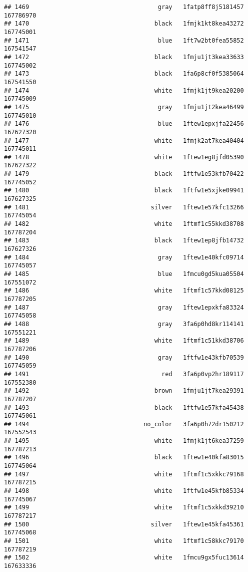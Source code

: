 \documentclass[
]{article}
\begin{document}
\begin{verbatim}
## 1469                                    gray   1fatp8ff8j5181457 167786970
## 1470                                   black   1fmjk1kt8kea43272 167745001
## 1471                                    blue   1ft7w2bt0fea55852 167541547
## 1472                                   black   1fmju1jt3kea33633 167745002
## 1473                                   black   1fa6p8cf0f5385064 167541550
## 1474                                   white   1fmjk1jt9kea20200 167745009
## 1475                                    gray   1fmju1jt2kea46499 167745010
## 1476                                    blue   1ftew1epxjfa22456 167627320
## 1477                                   white   1fmjk2at7kea40404 167745011
## 1478                                   white   1ftew1eg8jfd05390 167627322
## 1479                                   black   1ftfw1e53kfb70422 167745052
## 1480                                   black   1ftfw1e5xjke09941 167627325
## 1481                                  silver   1ftew1e57kfc13266 167745054
## 1482                                   white   1ftmf1c55kkd38708 167787204
## 1483                                   black   1ftew1ep8jfb14732 167627326
## 1484                                    gray   1ftew1e40kfc09714 167745057
## 1485                                    blue   1fmcu0gd5kua05504 167551072
## 1486                                   white   1ftmf1c57kkd08125 167787205
## 1487                                    gray   1ftew1epxkfa83324 167745058
## 1488                                    gray   3fa6p0hd8kr114141 167551221
## 1489                                   white   1ftmf1c51kkd38706 167787206
## 1490                                    gray   1ftfw1e43kfb70539 167745059
## 1491                                     red   3fa6p0vp2hr189117 167552380
## 1492                                   brown   1fmju1jt7kea29391 167787207
## 1493                                   black   1ftfw1e57kfa45438 167745061
## 1494                                no_color   3fa6p0h72dr150212 167552543
## 1495                                   white   1fmjk1jt6kea37259 167787213
## 1496                                   black   1ftew1e40kfa83015 167745064
## 1497                                   white   1ftmf1c5xkkc79168 167787215
## 1498                                   white   1ftfw1e45kfb85334 167745067
## 1499                                   white   1ftmf1c5xkkd39210 167787217
## 1500                                  silver   1ftew1e45kfa45361 167745068
## 1501                                   white   1ftmf1c58kkc79170 167787219
## 1502                                   white   1fmcu9gx5fuc13614 167633336

\end{verbatim}
\end{document}
